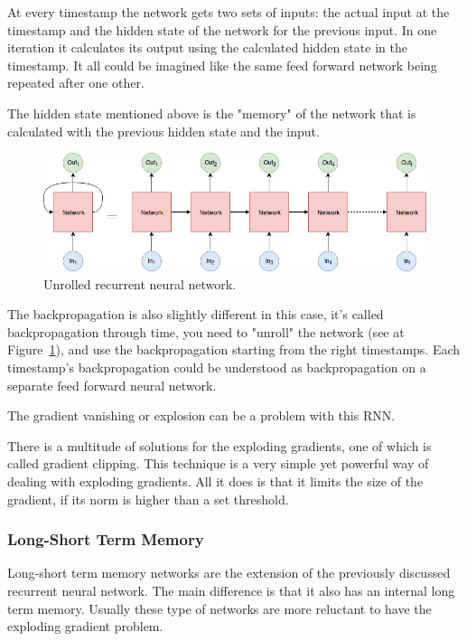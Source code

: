 At every timestamp the network gets two sets of inputs: the actual input at the timestamp and the hidden state of the network for the previous input. In one iteration it calculates its output using the calculated hidden state in the timestamp. It all could be imagined like the same feed forward network being repeated after one other.

The hidden state mentioned above is the "memory" of the network that is calculated with the previous hidden state and the input.

\begin{figure}[!ht]
	\centering
	\includegraphics[width=150mm, keepaspectratio]{figures/unrolled.jpg}
	\caption{Unrolled recurrent neural network.}
	\label{fig:unrolled}
\end{figure}

The backpropagation is also slightly different in this case, it's called backpropagation through time, you need to "unroll" the network (see at Figure~\ref{fig:unrolled}), and use the backpropagation starting from the right timestamps. Each timestamp's backpropagation could be understood as backpropagation on a separate feed forward neural network.

The gradient vanishing or explosion can be a problem with this RNN.

There is a multitude of solutions for the exploding gradients, one of which is called gradient clipping. This technique is a very simple yet powerful way of dealing with exploding gradients. All it does is that it limits the size of the gradient, if its norm is higher than a set threshold.

\subsubsection{Long-Short Term Memory}
Long-short term memory networks\cite{LSTM} are the extension of the previously discussed recurrent neural network. The main difference is that it also has an internal long term memory. Usually these type of networks are more reluctant to have the exploding gradient problem.

